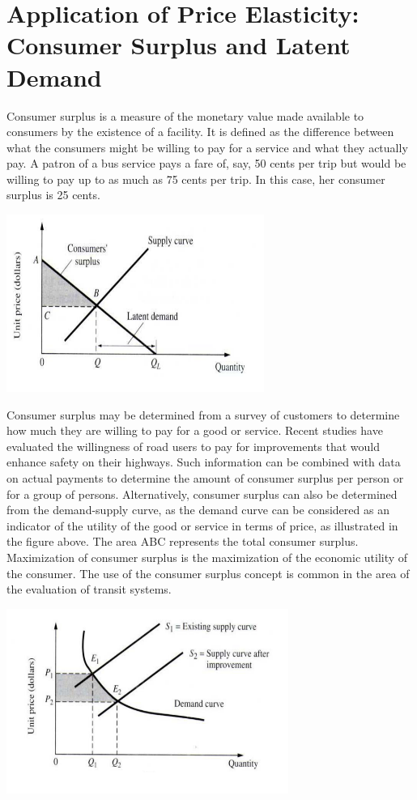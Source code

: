 \section{Application of Price Elasticity: Consumer Surplus and Latent Demand}
Consumer surplus is a measure of the monetary value made available to consumers by the existence of a facility. It is defined as the difference between what the consumers might be willing to pay for a service and what they actually pay. A patron of a bus service pays a fare of, say, 50 cents per trip but would be willing to pay up to as much as 75 cents per trip. In this case, her consumer surplus is 25 cents.
\begin{center}
	\includegraphics{gfx/fig47.png}
\end{center}
Consumer surplus may be determined from a survey of customers to determine how much they are willing to pay for a good or service. Recent studies have evaluated the willingness of road users to pay for improvements that would enhance safety on their highways. Such information can be combined with data on actual payments to determine the amount of consumer surplus per person or for a group of persons. Alternatively, consumer surplus can also be determined from the demand-supply curve, as the demand curve can be considered as an indicator of the utility of the good or service in terms of price, as illustrated in the figure above. The area ABC represents the total consumer surplus. Maximization of consumer surplus is the maximization of the economic utility of the consumer. The use of the consumer surplus concept is common in the area of the evaluation of transit systems.
\begin{center}
	\includegraphics{gfx/fig48.png}
\end{center}
